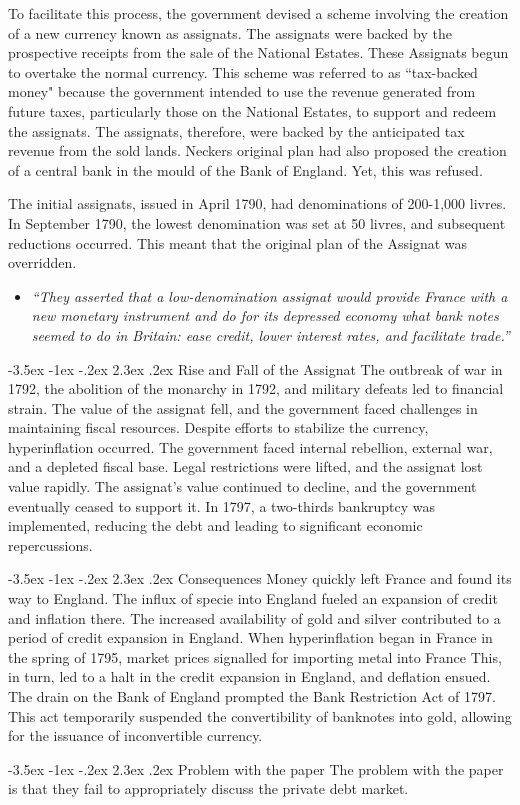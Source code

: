 \documentclass[]{article}
\makeatletter
\newcommand{\bb}{\bigbreak\noindent}
\renewcommand\section{\leftskip 0pt\@startsection {section}{1}{\z@}%
	{-3.5ex \@plus -1ex \@minus -.2ex}%
	{2.3ex \@plus.2ex}%
	{\normalfont\Large\bfseries}}
\makeatother
\begin{document}
	\bb 
	To facilitate this process, the government devised a scheme involving the creation of a new currency known as assignats. The assignats were backed by the prospective receipts from the sale of the National Estates. These Assignats begun to overtake the normal currency.
	\bb
	This scheme was referred to as ``tax-backed money" because the government intended to use the revenue generated from future taxes, particularly those on the National Estates, to support and redeem the assignats. The assignats, therefore, were backed by the anticipated tax revenue from the sold lands.
	\bb
	 Neckers original plan had also proposed the creation of a central bank in the mould of the Bank of England. Yet, this was refused.
	 
	 \bb
	 The initial assignats, issued in April 1790, had denominations of 200-1,000 livres. In September 1790, the lowest denomination was set at 50 livres, and subsequent reductions occurred. This meant that the original plan of the Assignat was overridden. 
	 \begin{itemize}
	 	\item \textit{``They asserted that a low-denomination assignat would provide France with a new monetary instrument and do for its depressed economy what bank notes seemed to do in Britain: ease credit, lower interest rates,
	 		and facilitate trade.''}
	 \end{itemize}

	\section{Rise and Fall of the Assignat}
	The outbreak of war in 1792, the abolition of the monarchy in 1792, and military defeats led to financial strain. The value of the assignat fell, and the government faced challenges in maintaining fiscal resources.
	\bb
	Despite efforts to stabilize the currency, hyperinflation occurred. The government faced internal rebellion, external war, and a depleted fiscal base. Legal restrictions were lifted, and the assignat lost value rapidly.
	\bb
	The assignat's value continued to decline, and the government eventually ceased to support it. In 1797, a two-thirds bankruptcy was implemented, reducing the debt and leading to significant economic repercussions.
	
	\section{Consequences}
	Money quickly left France and found its way to England.
	\bb
	The influx of specie into England fueled an expansion of credit and inflation there. The increased availability of gold and silver contributed to a period of credit expansion in England.
	\bb
	When hyperinflation began in France in the spring of 1795, market prices signalled for importing metal into France This, in turn, led to a halt in the credit expansion in England, and deflation ensued.
	\bb
	The drain on the Bank of England prompted the Bank Restriction Act of 1797. This act temporarily suspended the convertibility of banknotes into gold, allowing for the issuance of inconvertible currency.
	
	
	\section{Problem with the paper}
	The problem with the paper is that they fail to appropriately discuss the private debt market.   
\end{document}
